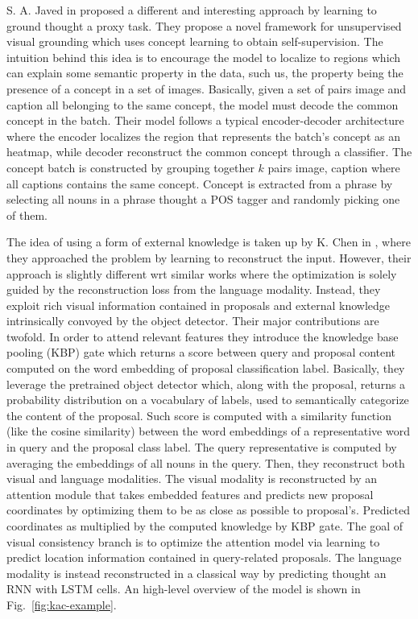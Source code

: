 S. A. Javed \etal{} in \cite{javed2018learning} proposed a different
and interesting approach by learning to ground thought a proxy task.
They propose a novel framework for unsupervised visual grounding which
uses concept learning to obtain self-supervision. The intuition behind
this idea is to encourage the model to localize to regions which can
explain some semantic property in the data, such us, the property
being the presence of a concept in a set of images. Basically, given a
set of pairs image and caption all belonging to the same concept, the
model must decode the common concept in the batch. Their model follows
a typical encoder-decoder architecture where the encoder localizes the
region that represents the batch's concept as an heatmap, while
decoder reconstruct the common concept through a classifier. The
concept batch is constructed by grouping together $k$ pairs image,
caption where all captions contains the same concept. Concept is
extracted from a phrase by selecting all nouns in a phrase thought a
POS tagger and randomly picking one of them.

The idea of using a form of external knowledge is taken up by K. Chen
\etal{} in \cite{chen2018knowledge}, where they approached the problem
by learning to reconstruct the input. However, their approach is
slightly different wrt similar works where the optimization is solely
guided by the reconstruction loss from the language modality. Instead,
they exploit rich visual information contained in proposals and
external knowledge intrinsically convoyed by the object detector.
Their major contributions are twofold. In order to attend relevant
features they introduce the knowledge base pooling (KBP) gate which
returns a score between query and proposal content computed on the
word embedding of proposal classification label. Basically, they
leverage the pretrained object detector which, along with the
proposal, returns a probability distribution on a vocabulary of
labels, used to semantically categorize the content of the proposal.
Such score is computed with a similarity function (like the cosine
similarity) between the word embeddings of a representative word in
query and the proposal class label. The query representative is
computed by averaging the embeddings of all nouns in the query. Then,
they reconstruct both visual and language modalities. The visual
modality is reconstructed by an attention module that takes embedded
features and predicts new proposal coordinates by optimizing them to
be as close as possible to proposal's. Predicted coordinates as
multiplied by the computed knowledge by KBP gate. The goal of visual
consistency branch is to optimize the attention model via learning to
predict location information contained in query-related proposals. The
language modality is instead reconstructed in a classical way by
predicting thought an RNN with LSTM cells. An high-level overview of
the model is shown in Fig.~\ref{fig:kac-example}.

